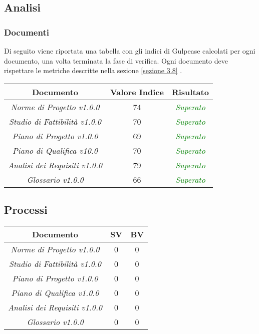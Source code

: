 \subsection{Analisi}
\subsubsection{Documenti}
\label{appendice 1}

Di seguito viene riportata una tabella con gli indici di \gls{Gulpease} calcolati per ogni documento, una volta terminata la fase di verifica. Ogni documento deve rispettare le metriche descritte nella sezione \ref{sezione 3.8} .\\

\hspace{1cm}

\begin{center}
	\begin{tabular}{|c|c|c|}
		\hline 
		\textbf{Documento} & \textbf{Valore Indice} & \textbf{Risultato} \\ 
		\hline
		\textit{Norme di Progetto v1.0.0} & 74 & \textcolor{green}{\textit{Superato}} \\ 
		\textit{Studio di Fattibilità v1.0.0} & 70 & \textcolor{green}{\textit{Superato}} \\ 
		\textit{Piano di Progetto v1.0.0} & 69 & \textcolor{green}{\textit{Superato}} \\ 
		\textit{Piano di Qualifica v10.0} & 70 & \textcolor{green}{\textit{Superato}} \\ 
		\textit{Analisi dei Requisiti v1.0.0} & 79 & \textcolor{green}{\textit{Superato}} \\ 
		\textit{Glossario v1.0.0} & 66 & \textcolor{green}{\textit{Superato}} \\ 
		\hline 
	\end{tabular}
\end{center}

\subsection{Processi}
\label{appendice 2}
\vspace{3mm}

\begin{center}
	\begin{tabular}{|c|c|c|}
		\toprule
			\textbf{Documento} & \textbf{SV} & \textbf{BV} \\ 
		\midrule
		\midrule
			\textit{Norme di Progetto v1.0.0} & 0 & 0 \\ 
			\textit{Studio di Fattibilità v1.0.0} & 0 & 0 \\ 
			\textit{Piano di Progetto v1.0.0} & 0 & 0 \\ 
			\textit{Piano di Qualifica v1.0.0} & 0 & 0 \\ 
			\textit{Analisi dei Requisiti v1.0.0} & 0 & 0 \\ 
			\textit{Glossario v1.0.0} & 0 & 0 \\ 
		\bottomrule
	\end{tabular}
\end{center}

